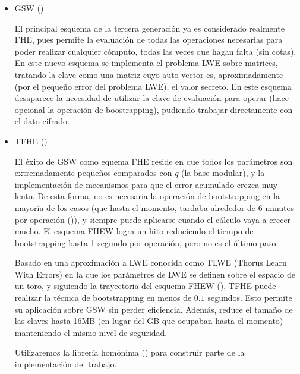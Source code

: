 \begin{itemize}

  \item GSW (\cite{gentry_homomorphic_2013})

  El principal esquema de la tercera generación ya es considerado realmente FHE, pues permite la evaluación de todas las operaciones necesarias para poder realizar cualquier cómputo, todas las veces que hagan falta (sin cotas). En este nuevo esquema se implementa el problema LWE sobre matrices, tratando la clave como una matriz cuyo auto-vector es, aproximadamente (por el pequeño error del problema LWE), el valor secreto. En este esquema desaparece la necesidad de utilizar la clave de evaluación para operar (hace opcional la operación de boostrapping), pudiendo trabajar directamente con el dato cifrado.

  \item TFHE (\cite{cheon_faster_2016})

  El éxito de GSW como equema FHE reside en que todos los parámetros son extremadamente pequeños comparados con $q$ (la base modular), y la implementación de mecanismos para que el error acumulado crezca muy lento. De esta forma, no es necesaria la operación de bootstrapping en la mayoría de los casos (que hasta el momento, tardaba alrededor de 6 minutos por operación (\cite{ducas_fhew:_2014})), y siempre puede aplicarse cuando el cálculo vaya a crecer mucho. El esquema FHEW logra un hito reduciendo el tiempo de bootstrapping hasta 1 segundo por operación, pero no es el último paso

  Basado en una aproximación a LWE conocida como TLWE (Thorus Learn With Errors) en la que los parámetros de LWE se definen sobre el espacio de un toro, y siguiendo la trayectoria del esquema FHEW (\cite{ducas_fhew:_2014}), TFHE puede realizar la técnica de bootstrapping en menos de $0.1$ segundos. Esto permite su aplicación sobre GSW sin perder eficiencia. Además, reduce el tamaño de las claves hasta 16MB (en lugar del GB que ocupaban hasta el momento) manteniendo el mismo nivel de seguridad.

  Utilizaremos la librería homónima (\cite{chillotti_tfhe:_2016}) para construir parte de la implementación del trabajo.
  
  

\end{itemize}

